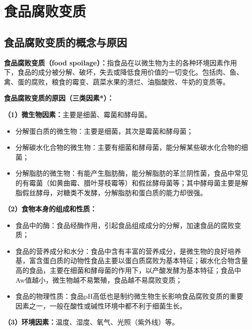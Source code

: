 \section{食品腐败变质}

\subsection{食品腐败变质的概念与原因}

\begin{keybox}
\textbf{食品腐败变质（food spoilage）：}指食品在以微生物为主的各种环境因素作用下，食品的成分被分解、破坏，失去或降低食用价值的一切变化。包括肉、鱼、禽、蛋的腐败，粮食的霉变、蔬菜水果的溃烂、油脂酸败、牛奶的变质等。

\textbf{食品腐败变质的原因（三类因素*）：}

\textbf{（1）微生物因素：}主要是细菌、霉菌和酵母菌。
\begin{itemize}[leftmargin=*]
    \item 分解蛋白质的微生物：主要是细菌，其次是霉菌和酵母菌；
    \item 分解碳水化合物的微生物：主要有细菌和酵母菌，能分解某些碳水化合物的细菌；
    \item 分解脂肪的微生物：有能产生脂肪酶，能分解脂肪的革兰阴性菌，食品中常见的有霉菌（如黄曲霉、腊叶芽枝霉等）和假丝酵母菌等；其中酵母菌主要是解脂假丝酵母，对糖类不发酵，分解脂肪和蛋白质的能力却很强。
\end{itemize}

\textbf{（2）食物本身的组成和性质：}
\begin{itemize}[leftmargin=*]
    \item 食品中的酶：食品经酶作用，引起食品组成成分的分解，加速食品的腐败变质；
    \item 食品的营养成分和水分：食品中含有丰富的营养成分，是微生物的良好培养基，富含蛋白质的动物性食品主要以蛋白质腐败为基本特征；碳水化合物含量高的食品，主要在细菌和酵母菌的作用下，以产酸发酵为基本特征；食品中Aw值越小，微生物越不易繁殖，食品越不易腐败变质；
    \item 食品的物理性质：食品pH高低也是制约微生物生长影响食品腐败变质的重要因素之一，一般在酸性或碱性环境中都不利于细菌生长。
\end{itemize}

\textbf{（3）环境因素：}温度、湿度、氧气、光照（紫外线）等。
\end{keybox}

